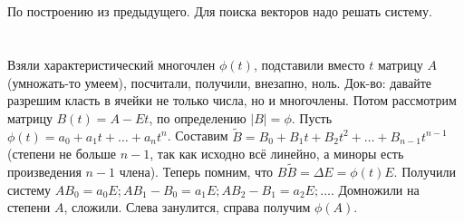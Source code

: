 \section{} %
По построению из предыдущего.
Для поиска векторов надо решать систему.

\section{} %
Взяли характеристический многочлен $\phi(t)$, подставили вместо $t$ матрицу $A$ (умножать-то умеем), посчитали, получили, внезапно, ноль.
Док-во: давайте разрешим класть в ячейки не только числа, но и многочлены.
Потом рассмотрим матрицу $B(t)=A-Et$, по определению $|B|=\phi$.
Пусть $\phi(t)=a_0+a_1t+\dots+a_nt^n$.
Составим $\tilde B = B_0+B_1t+B_2t^2+\dots+B_{n-1}t^{n-1}$ (степени не больше $n-1$, так как исходно всё линейно, а миноры есть произведения $n-1$ члена).
Теперь помним, что $B \tilde B = \Delta E = \phi(t) E$.
Получили систему $AB_0 = a_0E; AB_1-B_0=a_1E; AB_2-B_1=a_2E; \dots$.
Домножили на степени $A$, сложили.
Слева занулится, справа получим $\phi(A)$.
